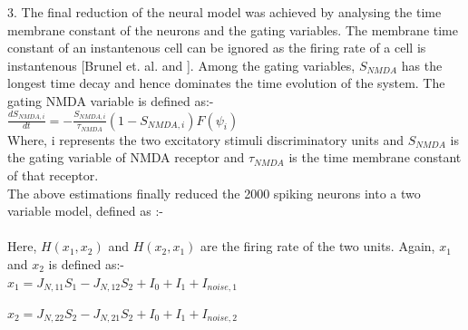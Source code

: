 3. The final reduction of the neural model was achieved by analysing the time membrane constant of the neurons and the gating variables. The membrane time constant of an instantenous cell can be ignored as the firing rate of a cell is instantenous [Brunel et. al. \cite{brunel2001effects} and \cite{fourcaud2002dynamics}]. Among the gating variables, $S_{NMDA}$ has the longest time decay and hence dominates the time evolution of the system. The gating NMDA variable is defined as:- \\

\indent $\frac{dS_{NMDA,i}}{dt} = - \frac{S_{NMDA,i}}{\tau_{NMDA}} (1 - S_{NMDA,i})F(\psi_{i})$\\

Where, i represents the two excitatory stimuli discriminatory units and $S_{NMDA}$ is the gating variable of NMDA receptor and $\tau_{NMDA}$ is the time membrane constant of that receptor.\\

The above estimations finally reduced the 2000 spiking neurons into a two variable model, defined as :-\\

\\

Here, $H(x_{1},x_{2})$ and $H(x_{2},x_{1})$ are the firing rate of the two units. Again, $x_{1}$ and $x_{2}$ is defined as:-\\

\indent $x_{1} = J_{N, 11} S_{1} - J_{N, 12} S_{2} + I_{0} + I_{1} + I_{noise,1}$

\indent $x_{2} = J_{N, 22} S_{2} - J_{N, 21} S_{2} + I_{0} + I_{1} + I_{noise,2}$

